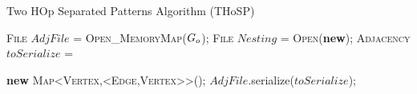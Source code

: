 \begin{algorithm}[!t]
	\caption{Two HOp Separated Patterns Algorithm (THoSP)}\label{alg:THoSPAlgorithm}
	\begin{adjustbox}{max width=\textwidth}
		\begin{minipage}{1.2\linewidth}
			\algrenewcommand\algorithmicindent{1em}
			\begin{algorithmic}[1]
				\State \textsc{File} $AdjFile$ = \textsc{Open\_MemoryMap}($G_o$);\label{openMMAP}
				\State \textsc{File} $Nesting$ = \textsc{Open}(\textbf{new});
				\State \textsc{Adjacency} $toSerialize$ = \par \textbf{new} \textsc{Map<Vertex,<Edge,Vertex>>}();
				\label{restriction}
				\label{firstJoin}
				\label{vdashalpha}
				 \label{substantiallyIs}
				 \label{substantiallyIs2}
				\label{thereIsEdge}
				\EndIf
				\EndFor
				\EndFor
				\EndIf
				\EndFor
				\State $AdjFile$.serialize($toSerialize$);\label{serialize}
				
				\EndProcedure
			\end{algorithmic}
		\end{minipage}
	\end{adjustbox}
\end{algorithm}

